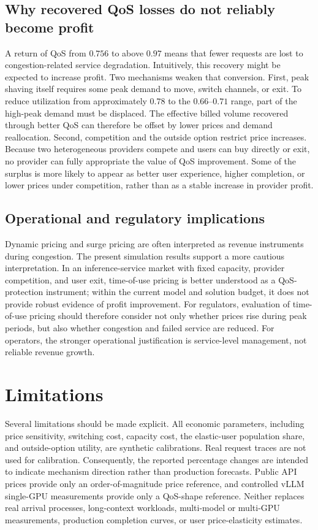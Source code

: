 \documentclass[11pt,a4paper]{article}
\begin{document}
\subsection{Why recovered QoS losses do not reliably become profit}

A return of QoS from $0.756$ to above $0.97$ means that fewer requests are lost to congestion-related service degradation. Intuitively, this recovery might be expected to increase profit. Two mechanisms weaken that conversion. First, peak shaving itself requires some peak demand to move, switch channels, or exit. To reduce utilization from approximately $0.78$ to the $0.66$--$0.71$ range, part of the high-peak demand must be displaced. The effective billed volume recovered through better QoS can therefore be offset by lower prices and demand reallocation. Second, competition and the outside option restrict price increases. Because two heterogeneous providers compete and users can buy directly or exit, no provider can fully appropriate the value of QoS improvement. Some of the surplus is more likely to appear as better user experience, higher completion, or lower prices under competition, rather than as a stable increase in provider profit.

\subsection{Operational and regulatory implications}

Dynamic pricing and surge pricing are often interpreted as revenue instruments during congestion. The present simulation results support a more cautious interpretation. In an inference-service market with fixed capacity, provider competition, and user exit, time-of-use pricing is better understood as a QoS-protection instrument; within the current model and solution budget, it does not provide robust evidence of profit improvement. For regulators, evaluation of time-of-use pricing should therefore consider not only whether prices rise during peak periods, but also whether congestion and failed service are reduced. For operators, the stronger operational justification is service-level management, not reliable revenue growth.

\section{Limitations}
\label{sec:limitations}

Several limitations should be made explicit. All economic parameters, including price sensitivity, switching cost, capacity cost, the elastic-user population share, and outside-option utility, are synthetic calibrations. Real request traces are not used for calibration. Consequently, the reported percentage changes are intended to indicate mechanism direction rather than production forecasts. Public API prices provide only an order-of-magnitude price reference, and controlled vLLM single-GPU measurements provide only a QoS-shape reference. Neither replaces real arrival processes, long-context workloads, multi-model or multi-GPU measurements, production completion curves, or user price-elasticity estimates.
\end{document}
